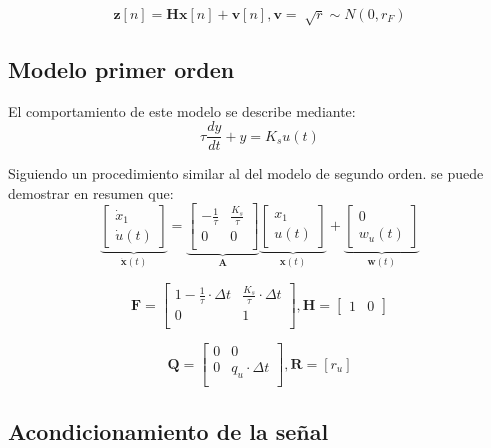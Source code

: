 \documentclass[conference]{IEEEtran}
\begin{document}
\[
\textbf{z}[n] = \textbf{H} \textbf{x}[n] + \textbf{v}[n] ,
\mathbf{v} = \sqrt[]{r}\sim N (0,r_F​)
\]


\subsection{Modelo primer orden}

El comportamiento de este modelo se describe mediante:
\[
\tau \frac{dy}{dt} + y = K_s u(t)
\]

Siguiendo un procedimiento similar al del modelo de segundo orden. se puede demostrar en resumen que:\\
\begin{equation*}
	\underbrace{
		\begin{bmatrix}
			\dot{x}_1 \\
			\dot{u}(t)
		\end{bmatrix}
	}_{\mathbf{\dot{x}}(t)}
	=
	\underbrace{\begin{bmatrix}
			-\frac{1}{\tau}           & \frac{K_s}{\tau}                 \\
			0 & 0   \\
	\end{bmatrix}}_{\mathbf{A}}
	\underbrace{\begin{bmatrix}
			x_1 \\
			u(t) 
	\end{bmatrix}}_{\mathbf{x}(t)}	
	+
	\underbrace{
		\begin{bmatrix}
			0 \\
			w_{u}(t)
		\end{bmatrix}
	}_{\mathbf{w}(t)}
\end{equation*}

\[
	\mathbf{F} = \begin{bmatrix}
		1 -\frac{1}{\tau} \cdot \Delta t          & \frac{K_s}{\tau} \cdot \Delta t               \\
		0 & 1 \\
	\end{bmatrix},
	\mathbf{H} =
	\begin{bmatrix}
		1 & 0
	\end{bmatrix}
\]

\[
\mathbf{Q} = \begin{bmatrix}
	0 & 0  \\
	0 & q_u \cdot \Delta t \\
\end{bmatrix}, 
\mathbf{R} = [r_u]
\]


\subsection{Acondicionamiento de la señal}
\end{document}
